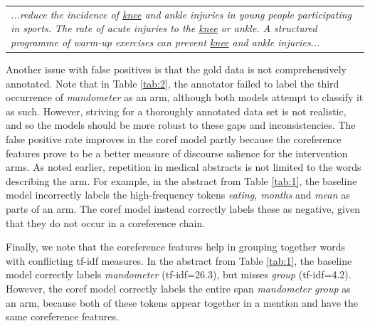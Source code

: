\begin{table}[h] 
\begin{tabular}{p{7cm}}
{\small \textit{...reduce the incidence of \uline{knee} and ankle injuries in young people participating in sports. The rate of acute injuries to the \uline{knee} or ankle. A structured programme of warm-up exercises can prevent \uline{knee} and ankle injuries...}}
\end{tabular}
\vspace{-1.8em}
\end{table}
\vspace{3 mm}  
Another issue with false positives is that the gold data is not comprehensively annotated. Note that in Table \ref{tab:2}, the annotator failed to label the third occurrence of \textit{mandometer} as an arm, although both models attempt to classify it as such. However, striving for a thoroughly annotated data set is not realistic, and so the models should be more robust to these gaps and inconsistencies. The false positive rate improves in the coref model partly because the coreference features prove to be a better measure of discourse salience for the intervention arms. As noted earlier, repetition in medical abstracts is not limited to the words describing the arm. For example, in the abstract from Table \ref{tab:1}, the baseline model incorrectly labels the high-frequency tokens \textit{eating, months} and \textit{mean} as parts of an arm. The coref model instead correctly labels these as negative, given that they do not occur in a coreference chain. 

Finally, we note that the coreference features help in grouping together words with  conflicting tf-idf measures. In the abstract from Table \ref{tab:1}, the baseline model correctly labels \textit{mandometer} (tf-idf=26.3), but misses \textit{group} (tf-idf=4.2). However, the coref model correctly labels the entire span \textit{mandometer group} as an arm, because both of these tokens appear together in a mention and have the same coreference features.

